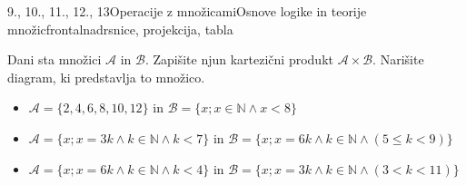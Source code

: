 \begin{priprava}{9., 10., 11., 12., 13}{}{Operacije z množicami}{Osnove logike in teorije množic}{frontalna}{drsnice, projekcija, tabla}
            \begin{naloga}
                Dani sta množici $\mathcal{A}$ in $\mathcal{B}$. Zapišite njun kartezični produkt $\mathcal{A}\times\mathcal{B}$.
                Narišite diagram, ki predstavlja to množico.
                \begin{itemize}
                    \item $\mathcal{A}=\{2,4,6,8,10,12\}$ in $\mathcal{B}=\{x; x\in\mathbb{N} \land x<8\}$
                    \item $\mathcal{A}=\{x; x=3k \land k\in\mathbb{N} \land k < 7\}$ in $\mathcal{B}=\{x; x=6k \land k\in\mathbb{N}\land (5\leq k<9)\}$
                    \item $\mathcal{A}=\{x; x=6k \land k\in\mathbb{N} \land k<4\}$ in $\mathcal{B}=\{x; x=3k \land k\in\mathbb{N}\land (3<k<11)\}$
                \end{itemize}
            \end{naloga}
    
    
              


\end{priprava}